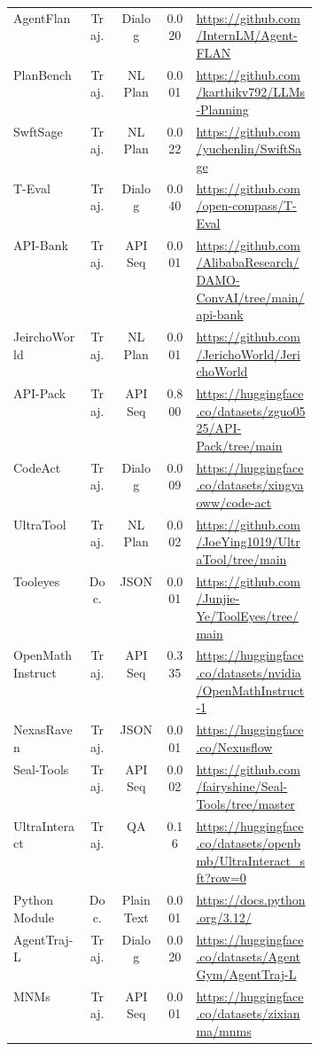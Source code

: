 \begin{table*}[ht]
\begin{tabular}{@{}lcccp{0.4\linewidth}@{}}
AgentFlan~\cite{chen2024agent} & Traj. & Dialog & 0.020 & \url{https://github.com/InternLM/Agent-FLAN} \\
PlanBench~\cite{valmeekam2024planbench} & Traj. & NL Plan & 0.001 & \url{https://github.com/karthikv792/LLMs-Planning} \\
SwftSage~\cite{lin2024swiftsage} & Traj. & NL Plan & 0.022 & \url{https://github.com/yuchenlin/SwiftSage} \\
T-Eval~\cite{chen2023t} & Traj. & Dialog & 0.040 & \url{https://github.com/open-compass/T-Eval} \\
API-Bank~\cite{li2023api} & Traj. & API Seq & 0.001 & \url{https://github.com/AlibabaResearch/DAMO-ConvAI/tree/main/api-bank} \\
JeirchoWorld~\cite{ammanabrolu2021modeling} & Traj. & NL Plan & 0.001 & \url{https://github.com/JerichoWorld/JerichoWorld} \\
API-Pack~\cite{guo2024api} & Traj. & API Seq & 0.800 & \url{https://huggingface.co/datasets/zguo0525/API-Pack/tree/main}\\
CodeAct~\cite{lv2024codeact} & Traj. & Dialog & 0.009 & \url{https://huggingface.co/datasets/xingyaoww/code-act} \\
UltraTool~\cite{huang2024planning} & Traj. & NL Plan & 0.002 &\url{https://github.com/JoeYing1019/UltraTool/tree/main} \\
Tooleyes~\cite{ye2024tooleyes} & Doc. & JSON & 0.001 & \url{https://github.com/Junjie-Ye/ToolEyes/tree/main}\\
OpenMathInstruct~\cite{toshniwal2024openmathinstruct} & Traj. & API Seq & 0.335 & \url{https://huggingface.co/datasets/nvidia/OpenMathInstruct-1}\\
NexasRaven~\cite{srinivasan2023nexusraven} & Traj. & JSON & 0.001 & \url{https://huggingface.co/Nexusflow}\\
Seal-Tools~\cite{wu2024seal} & Traj. & API Seq & 0.002 & \url{https://github.com/fairyshine/Seal-Tools/tree/master} \\
UltraInteract~\cite{yuan2024advancing} & Traj. & QA & 0.16 & \url{https://huggingface.co/datasets/openbmb/UltraInteract_sft?row=0} \\
Python Module & Doc. & Plain Text & 0.001 & \url{https://docs.python.org/3.12/} \\
AgentTraj-L~\cite{xi2024agentgym} & Traj. & Dialog & 0.020 & \url{https://huggingface.co/datasets/AgentGym/AgentTraj-L} \\
MNMs~\cite{ma2024mms} & Traj. & API Seq & 0.001 & \url{https://huggingface.co/datasets/zixianma/mnms} \\

\end{tabular}
\end{table*}
